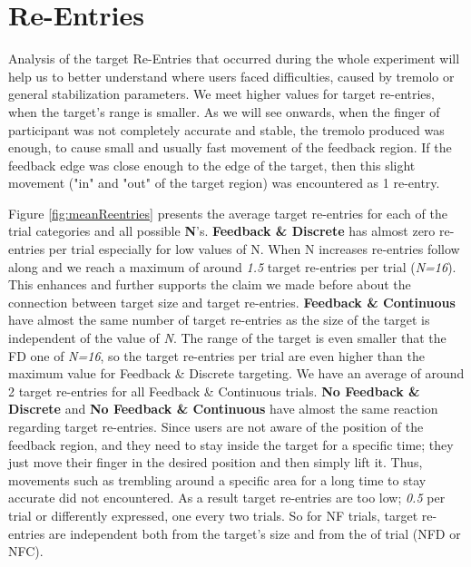 \section{Re-Entries}
\label{resultsReEntries}

Analysis of the target Re-Entries that occurred during the whole experiment will help us to better understand where users faced difficulties, caused by tremolo or general stabilization parameters. We meet higher values for target re-entries, when the target's range is smaller. As we will see onwards, when the finger of participant was not completely accurate and stable, the tremolo produced was enough, to cause small and usually fast movement of the feedback region. If the feedback edge was close enough to the edge of the target, then this slight movement ("in" and "out" of the target region) was encountered as 1 re-entry. 

Figure \ref{fig:meanReentries} presents the average target re-entries for each of the trial categories and  all possible \textbf{N}'s. \textbf{Feedback \& Discrete} has almost zero re-entries per trial especially for low values of N. When N increases re-entries follow along and we reach a maximum of around \emph{1.5} target re-entries per trial (\emph{N=16}). This enhances and further supports the claim we made before about the connection between target size and target re-entries.
\textbf{Feedback \& Continuous} have almost the same number of target re-entries as the size of the target is independent of the value of \emph{N}. The range of the target is even smaller that the FD one of \emph{N=16}, so the target re-entries per trial are even higher than the maximum value for Feedback \& Discrete targeting. We have an average of around 2 target re-entries for all Feedback \& Continuous trials. 
\textbf{No Feedback \& Discrete} and \textbf{No Feedback \& Continuous} have almost the same reaction regarding target re-entries. Since users are not aware of the position of the feedback region, and they need to stay inside the target for a specific time; they just move their finger in the desired position and then simply lift it. Thus, movements such as trembling around a specific area for a long time to stay accurate did not encountered. As a result target re-entries are too low; \emph{0.5} per trial or differently expressed, one every two trials. So for NF trials, target re-entries are independent both from the target's size and from the of trial (NFD or NFC). 



